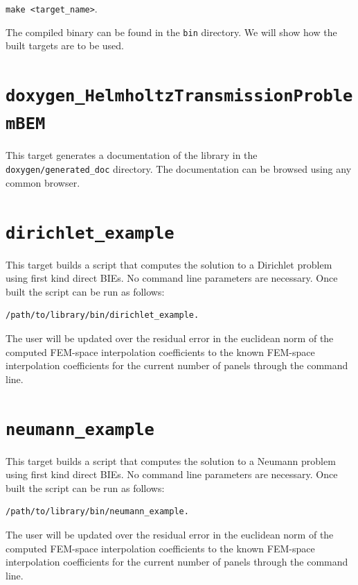 \documentclass[a4paper, oneside]{thirdparty_stylesheets/discothesis}
\begin{document}
\verb|make <target_name>|.

The compiled binary can be found in the \verb|bin| directory.
We will show how the built targets are to be used.

\cprotect\section{\verb|doxygen_HelmholtzTransmissionProblemBEM|}
This target generates a documentation of the library in the \verb|doxygen/generated_doc| directory.
The documentation can be browsed using any common browser.

\cprotect\section{\verb|dirichlet_example|}
This target builds a script that computes the solution to a Dirichlet problem
using first kind direct BIEs.
No command line parameters are necessary.
Once built the script can be run as follows: 
\begin{verbatim}
/path/to/library/bin/dirichlet_example.
\end{verbatim}
The user will be updated over the residual error in the euclidean norm of the computed FEM-space interpolation coefficients to the known FEM-space interpolation coefficients for the current number of panels through the command line.

\cprotect\section{\verb|neumann_example|}
This target builds a script that computes the solution to a Neumann problem
using first kind direct BIEs.
No command line parameters are necessary.
Once built the script can be run as follows: 
\begin{verbatim}
/path/to/library/bin/neumann_example.
\end{verbatim}
The user will be updated over the residual error in the euclidean norm of the computed FEM-space interpolation coefficients to the known FEM-space interpolation coefficients for the current number of panels through the command line.
\end{document}
